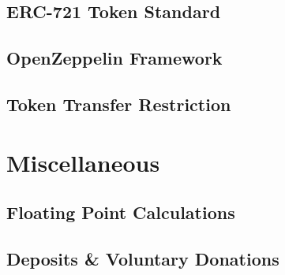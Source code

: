 \subsection{ERC-721 Token Standard}
\subsection{OpenZeppelin Framework}
\subsection{Token Transfer Restriction}

\pagebreak

\section{Miscellaneous}
\subsection{Floating Point Calculations}
\subsection{Deposits \& Voluntary Donations}
